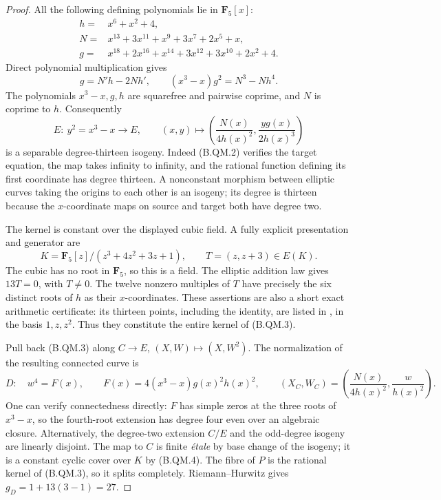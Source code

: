\begin{proof}
All the following defining polynomials lie in $\mathbf F_5[x]$:
\[
\begin{split}
 h={}&x^6+x^2+4,\\
 N={}&x^{13}+3x^{11}+x^9+3x^7+2x^5+x,\\
 g={}&x^{18}+2x^{16}+x^{14}+3x^{12}+3x^{10}+2x^2+4.
\end{split}                                                    \tag{B.QM.1}
\]
Direct polynomial multiplication gives
\[
 g=N'h-2Nh',\qquad
       (x^3-x)g^2=N^3-Nh^4.                                    \tag{B.QM.2}
\]
The polynomials $x^3-x,g,h$ are squarefree and pairwise coprime,
and $N$ is coprime to $h$. Consequently
\[
 E:\ y^2=x^3-x\longrightarrow E,\qquad
       (x,y)\longmapsto
       \left(\frac{N(x)}{4h(x)^2},\frac{y g(x)}{2h(x)^3}\right)
                                                                  \tag{B.QM.3}
\]
is a separable degree-thirteen isogeny. Indeed (B.QM.2) verifies
the target equation, the map takes infinity to infinity, and
the rational function defining its first coordinate has degree
thirteen. A nonconstant morphism between elliptic curves taking
the origins to each other is an isogeny; its degree is thirteen
because the $x$-coordinate maps on source and target both have
degree two.

The kernel is constant over the displayed cubic field. A fully
explicit presentation and generator are
\[
 K=\mathbf F_5[z]/(z^3+4z^2+3z+1),\qquad
                    T=(z,z+3)\in E(K).                           \tag{B.QM.4}
\]
The cubic has no root in $\mathbf F_5$, so this is a field.
The elliptic addition law gives $13T=0$, with $T\ne0$.
The twelve nonzero multiples of $T$ have precisely the six
distinct roots of $h$ as their $x$-coordinates. These assertions
are also a short exact arithmetic certificate: its thirteen
points, including the identity, are listed in
, in the basis
$1,z,z^2$. Thus they constitute the entire kernel of (B.QM.3).

Pull back (B.QM.3) along $C\to E$, $(X,W)\mapsto(X,W^2)$.
The normalization of the resulting connected curve is
\[
 D:\quad w^4=F(x),\qquad
 F(x)=4(x^3-x)g(x)^2h(x)^2,\qquad
 (X_C,W_C)=\left(\frac{N(x)}{4h(x)^2},\frac{w}{h(x)^2}\right).
                                                                  \tag{B.QM.5}
\]
One can verify connectedness directly: $F$ has simple zeros
at the three roots of $x^3-x$, so the fourth-root extension
has degree four even over an algebraic closure. Alternatively,
the degree-two extension $C/E$ and the odd-degree isogeny are
linearly disjoint. The map to $C$ is finite \emph{\'etale} by
base change of the isogeny; it is a constant cyclic cover over
$K$ by (B.QM.4). The fibre of $P$ is the rational kernel of
(B.QM.3), so it splits completely. Riemann--Hurwitz gives
$g_D=1+13(3-1)=27$.


\end{proof}
